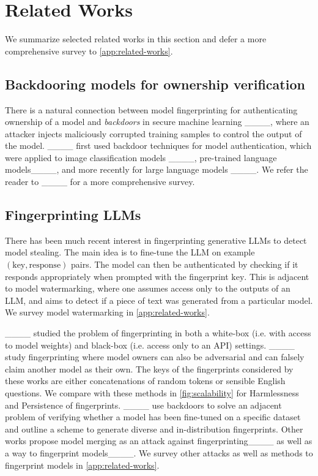 \section{Related Works}
We summarize selected related works in this section and defer a more comprehensive survey to \cref{app:related-works}.

\subsection{Backdooring models for ownership verification}
There is a natural connection between model fingerprinting for authenticating ownership of a model and {\em backdoors} in secure machine learning ____, where an attacker injects maliciously corrupted training samples to control the output of the model.  ____ first used backdoor techniques for model authentication, which were applied to image classification models ____, pre-trained language models____, and more recently for large language models ____.  We refer the reader to ____ for a more comprehensive survey.    

\subsection{Fingerprinting LLMs}
There has been much recent interest in fingerprinting generative LLMs to detect model stealing. The main idea is to fine-tune the LLM on example \((\mathrm{key}, \mathrm{response})\) pairs. The model can then be authenticated by checking if it responds appropriately when prompted with the fingerprint \(\mathrm{key}\). This is adjacent to model watermarking, where one assumes access only to the outputs of an LLM, and aims to detect if a piece of text was generated from a particular model. We survey model watermarking in \cref{app:related-works}.

____ studied the problem of fingerprinting in both a white-box (i.e. with access to model weights) and black-box (i.e. access only to an API) settings. 
____ study fingerprinting where model owners can also be adversarial and can falsely claim another model as their own. 
The keys of the fingerprints considered by these works are either concatenations of random tokens or sensible English questions. We compare with these methods in \cref{fig:scalability} for Harmlessness and Persistence of fingerprints. ____ use backdoors to solve an adjacent problem of verifying whether a model has been fine-tuned on a specific dataset and outline a scheme to generate diverse and in-distribution fingerprints. Other works propose model merging as an attack against fingerprinting____ as well as a way to fingerprint models____. We survey other attacks as well as methods to fingerprint models in \cref{app:related-works}.








